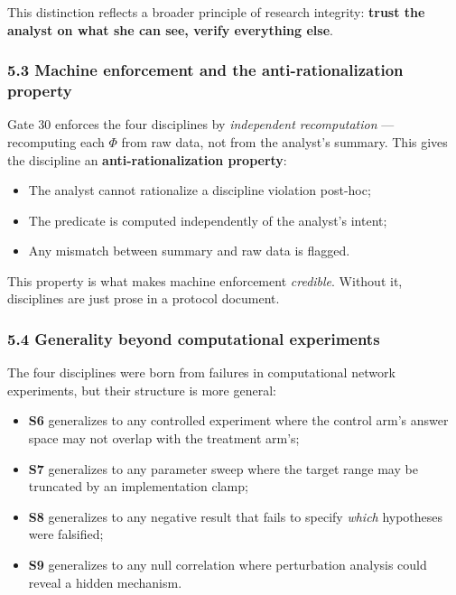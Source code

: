 \documentclass[
]{article}
\providecommand{\tightlist}{%
  \setlength{\itemsep}{0pt}\setlength{\parskip}{0pt}}
\begin{document}
This distinction reflects a broader principle of research integrity:
\textbf{trust the analyst on what she can see, verify everything else}.

\subsubsection{5.3 Machine enforcement and the anti-rationalization
property}\label{machine-enforcement-and-the-anti-rationalization-property}

Gate 30 enforces the four disciplines by \emph{independent
recomputation} --- recomputing each \(\Phi\) from raw data, not from the
analyst's summary. This gives the discipline an
\textbf{anti-rationalization property}:

\begin{itemize}
\tightlist
\item
  The analyst cannot rationalize a discipline violation post-hoc;
\item
  The predicate is computed independently of the analyst's intent;
\item
  Any mismatch between summary and raw data is flagged.
\end{itemize}

This property is what makes machine enforcement \emph{credible}. Without
it, disciplines are just prose in a protocol document.

\subsubsection{5.4 Generality beyond computational
experiments}\label{generality-beyond-computational-experiments}

The four disciplines were born from failures in computational network
experiments, but their structure is more general:

\begin{itemize}
\tightlist
\item
  \textbf{S6} generalizes to any controlled experiment where the control
  arm's answer space may not overlap with the treatment arm's;
\item
  \textbf{S7} generalizes to any parameter sweep where the target range
  may be truncated by an implementation clamp;
\item
  \textbf{S8} generalizes to any negative result that fails to specify
  \emph{which} hypotheses were falsified;
\item
  \textbf{S9} generalizes to any null correlation where perturbation
  analysis could reveal a hidden mechanism.
\end{itemize}
\end{document}
